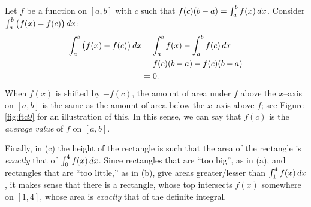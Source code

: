 \documentclass{ximera}
\begin{document}
Let $f$ be a function on $[a,b]$ with $c$ such that $f(c)(b-a) =
\int_a^bf(x)\,d x$. Consider $\int_a^b\big(f(x)-f(c)\big)\,d x$:
\begin{align*}
  \int_a^b\big(f(x)-f(c)\big)\,d x &= \int_a^b f(x) - \int_a^b f(c)\,d x\\
  &= f(c)(b-a) - f(c)(b-a) \\
  &= 0.
\end{align*}
When $f(x)$ is shifted by $-f(c)$, the amount of area under $f$ above
the $x$--axis on $[a,b]$ is the same as the amount of area below the
$x$--axis above $f$; see Figure \ref{fig:ftc9} for an illustration of
this. In this sense, we can say that $f(c)$ is the \textit{average
  value} of $f$ on $[a,b]$.


Finally, in (c) the height of the rectangle is such that the area of
the rectangle is \textit{exactly} that of $\int_0^4 f(x)\,d x$. Since
rectangles that are ``too big'', as in (a), and rectangles that are
``too little,'' as in (b), give areas greater/lesser than $\int_1^4
f(x)\,d x$, it makes sense that there is a rectangle, whose top
intersects $f(x)$ somewhere on $[1,4]$, whose area is \textit{exactly}
that of the definite integral.
\end{document}
